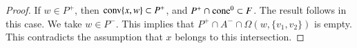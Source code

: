 \begin{tarskidata}
\begin{tarski}
\begin{proof}
If $w\in P^+$, then ${\operatorname{conv}}\{x,w\}\subset P^+$, and
$P^+\cap {\operatorname{cone}}^0 \subset F$.  The result follows in this case.
We take $w\in P^-$.  This implies that $P^+\cap A^-\cap \Omega(w,\{v_1,v_2\})$
is empty.  This contradicts the assumption that $x$ belongs to this
intersection.
%
%
%
%
%
%
% 
\end{proof}
\end{tarski}

 



\begin{tarski}


\end{tarski}
\end{tarskidata}
